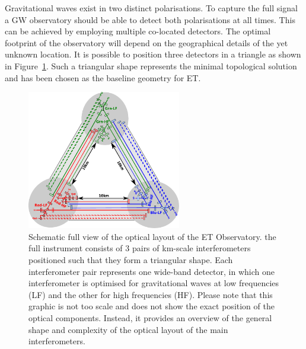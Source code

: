 Gravitational waves exist in two distinct polarisations. To capture the
full signal a GW observatory should be able to detect both polarisations at
all times. This can be achieved by employing multiple co-located
detectors. The optimal footprint of the observatory will depend on the
geographical details of the yet unknown location. It is possible to
position three detectors in a triangle as shown in Figure~\ref{fig:ET_full_triangle}.
Such a triangular shape represents the minimal topological solution and
has been chosen as the baseline geometry for ET.
\begin{figure}[h]
	\centering
		\includegraphics[width=0.6\textwidth]{Sec_Optics/ET_full_april2011.pdf}
	\caption{Schematic full view of the optical layout of the ET
    Observatory. 
 the full instrument consists of 3 pairs of km-scale
    interferometers positioned such that they form a triangular
    shape. Each interferometer pair represents one wide-band detector,
    in which one interferometer is optimised for gravitational waves
    at low frequencies (LF) and the other for high frequencies (HF).
Please note that this graphic is not too scale and does not show the exact position of the
optical components. Instead, it provides an overview of the general shape and
complexity of the optical layout of the main interferometers.
}
	\label{fig:ET_full_triangle}
\end{figure}

